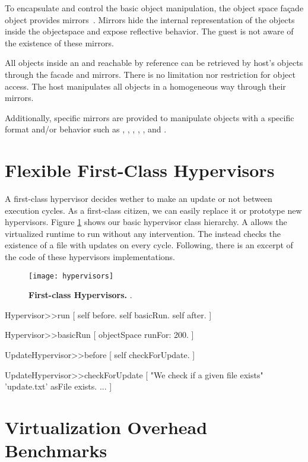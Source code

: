 To encapsulate and control the basic object manipulation, the object space fa\c{c}ade object provides mirrors~\cite{Brac04b}. Mirrors hide the internal representation of the objects inside the objectspace and expose reflective behavior. The guest is not aware of the existence of these mirrors.

All objects inside an \objectspace and reachable by reference can be retrieved by host's objects through the \objectspace facade and mirrors. 
There is no limitation nor restriction for object access. 
The host manipulates all objects in a homogeneous way through their mirrors. 

Additionally, specific mirrors are provided to manipulate objects with a specific format and/or behavior such as , , , , , and .

\section{Flexible First-Class Hypervisors}\label{sec:hypervisor}

A first-class hypervisor decides wether to make an update or not between execution cycles. As a first-class citizen, we can easily replace it or prototype new hypervisors. Figure \ref{fig:hypervisors} shows our basic hypervisor class hierarchy. A  allows the virtualized runtime to run without any intervention. The  instead checks the existence of a file with updates on every cycle. Following, there is an excerpt of the code of these hypervisors implementations.

\begin{figure}[ht]
\center
\texttt{[image: hypervisors]}
\caption{\textbf{First-class Hypervisors.} .\label{fig:hypervisors}}
\end{figure}

\begin{code}
Hypervisor>>run [
    self before.
    self basicRun.
    self after.
]

Hypervisor>>basicRun [
    objectSpace runFor: 200.
]

UpdateHypervisor>>before [
    self checkForUpdate.
]

UpdateHypervisor>>checkForUpdate [
    "We check if a given file exists"
    'update.txt' asFile exists.
    ...
]
\end{code}

\section{Virtualization Overhead Benchmarks} \label{sec:solution}


